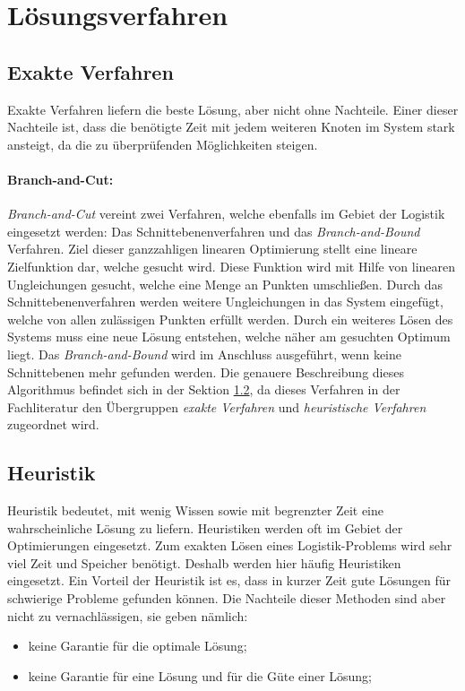\section{Lösungsverfahren}

\subsection{Exakte Verfahren}

Exakte Verfahren liefern die beste Lösung, aber nicht ohne Nachteile.  
Einer dieser Nachteile ist, dass die benötigte Zeit mit jedem weiteren Knoten im System stark ansteigt, da die zu überprüfenden Möglichkeiten  steigen. 

\paragraph{Branch-and-Cut:}	

\textit{Branch-and-Cut} vereint zwei Verfahren, welche ebenfalls im Gebiet der Logistik eingesetzt werden: Das Schnittebenenverfahren und das \textit{Branch-and-Bound} Verfahren. 
Ziel dieser ganzzahligen linearen Optimierung stellt eine lineare Zielfunktion dar, welche gesucht wird. 
Diese Funktion wird mit Hilfe von linearen Ungleichungen gesucht, welche eine Menge an Punkten umschließen. 
Durch das Schnittebenenverfahren werden weitere Ungleichungen in das System eingefügt, welche von allen zulässigen Punkten erfüllt werden. 
Durch ein weiteres Lösen des Systems muss eine neue Lösung entstehen, welche näher am gesuchten Optimum liegt.
Das \textit{Branch-and-Bound} wird im Anschluss ausgeführt, wenn keine Schnittebenen mehr gefunden werden. 
Die genauere Beschreibung dieses Algorithmus befindet sich in der Sektion \ref{Heuristik}, da dieses Verfahren in der Fachliteratur den Übergruppen \textit{exakte Verfahren} und \textit{heuristische Verfahren} zugeordnet wird. 

\subsection{Heuristik}
\label{Heuristik}

Heuristik bedeutet, mit wenig Wissen sowie mit begrenzter Zeit eine wahrscheinliche Lösung zu liefern. 
Heuristiken werden oft im Gebiet der Optimierungen eingesetzt. 
Zum exakten Lösen eines Logistik-Problems wird sehr viel Zeit und Speicher benötigt. 
Deshalb werden hier häufig Heuristiken eingesetzt. 
Ein Vorteil der Heuristik ist es, dass in kurzer Zeit gute Lösungen für schwierige Probleme gefunden können. 
Die Nachteile dieser Methoden sind aber nicht zu vernachlässigen, sie geben nämlich:
\begin{itemize}
	\item keine Garantie für die optimale Lösung;
	\item keine Garantie für eine Lösung und für die Güte einer Lösung;
\end{itemize}

